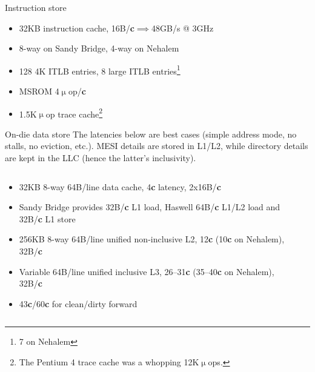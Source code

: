 \documentclass[mathserif,xcolor={dvipsnames,table}]{beamer}
\begin{document}
\begin{frame}{Instruction store}
\begin{itemize}
\item 32KB instruction cache, 16B/\textbf{c}$\implies$48GB/s @ 3GHz
\item 8-way on Sandy Bridge, 4-way on Nehalem
\item 128 4K ITLB entries, 8 large ITLB entries\footnote{7 on Nehalem}
\item MSROM 4$\upmu$op/\textbf{c}
\item 1.5K$\upmu$op trace cache\footnote{The Pentium 4 trace cache was a whopping 12K$\upmu$ops.}
\end{itemize}
\end{frame}

\begin{frame}{On-die data store}
The latencies below are best cases (simple address mode, no stalls, no eviction, etc.). MESI details are stored
in L1/L2, while directory details are kept in the LLC (hence the latter's
inclusivity).
\vfill
\begin{columns}
\begin{column}{0.5\textwidth}
\small{
\begin{itemize}
\item 32KB 8-way 64B/line data cache, 4\textbf{c} latency, 2x16B/\textbf{c}
\item Sandy Bridge provides 32B/\textbf{c} L1 load, Haswell 64B/\textbf{c} L1/L2 load and 32B/\textbf{c} L1 store
\item 256KB 8-way 64B/line unified non-inclusive L2, 12\textbf{c} (10\textbf{c} on Nehalem), 32B/\textbf{c}
\item Variable 64B/line unified inclusive L3, 26--31\textbf{c} (35--40\textbf{c} on Nehalem), 32B/\textbf{c}
\item 43\textbf{c}/60\textbf{c} for clean/dirty forward
\end{itemize}
}
\end{column}
\begin{column}{0.5\textwidth}

\end{column}
\end{columns}
\end{frame}
\end{document}
